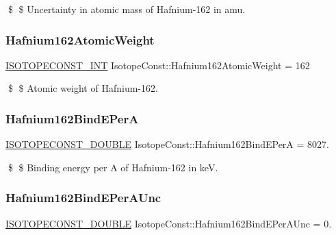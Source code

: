 \$ \$ Uncertainty in atomic mass of Hafnium-\/162 in amu. \mbox{\label{group___isotope_const-_hafnium-_hf162_gaffd6caa7edcc08c265b0af2222c9779a}} 
\subsubsection{\texorpdfstring{Hafnium162\+Atomic\+Weight}{Hafnium162AtomicWeight}}
{\footnotesize\ttfamily \mbox{\hyperlink{group___isotope_const-_macros_ga5f18360b3e99483a35c32d789e62621c}{I\+S\+O\+T\+O\+P\+E\+C\+O\+N\+S\+T\+\_\+\+I\+NT}} Isotope\+Const\+::\+Hafnium162\+Atomic\+Weight = 162}

\$ \$ Atomic weight of Hafnium-\/162. \mbox{\label{group___isotope_const-_hafnium-_hf162_gac22c965b0e55b7de5ead6d644ddb8ca5}} 
\subsubsection{\texorpdfstring{Hafnium162\+Bind\+E\+PerA}{Hafnium162BindEPerA}}
{\footnotesize\ttfamily \mbox{\hyperlink{group___isotope_const-_macros_ga8f45a7272ce02c0b4c65c44636ed719a}{I\+S\+O\+T\+O\+P\+E\+C\+O\+N\+S\+T\+\_\+\+D\+O\+U\+B\+LE}} Isotope\+Const\+::\+Hafnium162\+Bind\+E\+PerA = 8027.}

\$ \$ Binding energy per A of Hafnium-\/162 in keV. \mbox{\label{group___isotope_const-_hafnium-_hf162_gaf1e941605b13fd0f30f95a2ee60a04f6}} 
\subsubsection{\texorpdfstring{Hafnium162\+Bind\+E\+Per\+A\+Unc}{Hafnium162BindEPerAUnc}}
{\footnotesize\ttfamily \mbox{\hyperlink{group___isotope_const-_macros_ga8f45a7272ce02c0b4c65c44636ed719a}{I\+S\+O\+T\+O\+P\+E\+C\+O\+N\+S\+T\+\_\+\+D\+O\+U\+B\+LE}} Isotope\+Const\+::\+Hafnium162\+Bind\+E\+Per\+A\+Unc = 0.}

